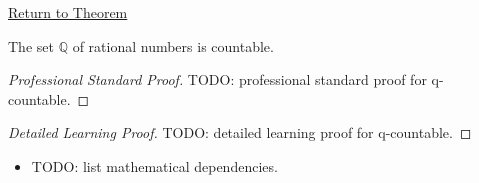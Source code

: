 \newpage
{}
\label{prf:q-countable}
\label{prf:Q-countable}

\begin{remark*}[Return]
\hyperref[thm:Q-countable]{Return to Theorem}
\end{remark*}


\begin{theorem*}
The set $\mathbb{Q}$ of rational numbers is countable.
\end{theorem*}

\begin{proof}[Professional Standard Proof]
\LRAProofBodyStart
TODO: professional standard proof for q-countable.
\end{proof}

\begin{proof}[Detailed Learning Proof]
\LRAProofBodyStart
TODO: detailed learning proof for q-countable.
\end{proof}

\begin{remark*}
\end{remark*}

\begin{dependencies}
\begin{itemize}
  \item TODO: list mathematical dependencies.
\end{itemize}
\end{dependencies}

\clearpage
